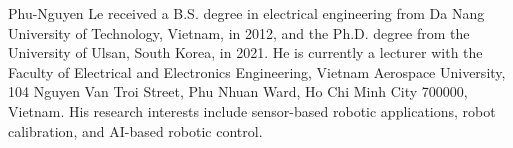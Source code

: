 \documentclass[journal]{IEEEtran}
\begin{document}
\begin{IEEEbiographynophoto}{Phu-Nguyen Le}
received a B.S. degree in electrical engineering from Da Nang University of Technology, Vietnam, in 2012, and the Ph.D. degree from the University of Ulsan, South Korea, in 2021. He is currently a lecturer with the Faculty of Electrical and Electronics Engineering, Vietnam Aerospace University, 104 Nguyen Van Troi Street, Phu Nhuan Ward, Ho Chi Minh City 700000, Vietnam. His research interests include sensor-based robotic applications, robot calibration, and AI-based robotic control.
\end{IEEEbiographynophoto}
\end{document}
